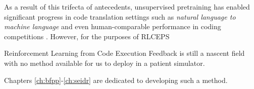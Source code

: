 As a result of this trifecta of antecedents, unsupervised pretraining has enabled significant progress in code translation settings such as \emph{natural language to machine language} \cite{chenEvaluatingLargeLanguage2021,yinLearningMineAligned2018,guoContentEnhancedBERTbased2020,hallerPECCProblemExtraction2024,hendrycksMeasuringCodingChallenge2021,honarvarTurbulenceSystematicallyAutomatically2025,huQualityFlowAgenticWorkflow2025,jimenezSWEbenchCanLanguage2024,leiPlanningDrivenProgrammingLarge2025,liEnablingProgrammingThinking2023,liExploringEffectivenessLlms2023,helmuthPSB2SecondProgram2021,solimanMarianCGCodeGeneration2022,the-crypt-keeperThecryptkeeperCanaicode2025,zhuoBigCodeBenchBenchmarkingCode2024} and even human-comparable performance in coding competitions \cite{liCompetitionLevelCodeGeneration2022,openaiCompetitiveProgrammingLarge2025}.
However, for the purposes of RLCEPS

\begin{highlight}
    Reinforcement Learning from Code Execution Feedback is still a nascent field with no method available for us to deploy in a patient simulator.
\end{highlight}

Chapters \ref{ch:bfpp}-\ref{ch:seidr} are dedicated to developing such a method.
